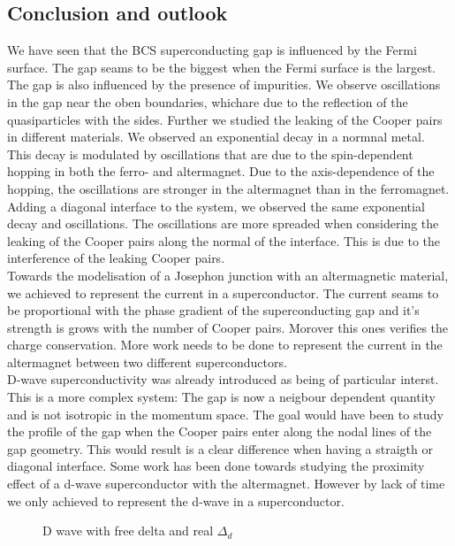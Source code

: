 \documentclass[..\main.tex]{subfile}
\begin{document}
\subsection{Conclusion and outlook}
We have seen that the BCS superconducting gap is influenced by the Fermi surface. The gap seams to be the biggest when the Fermi surface is the largest.
The gap is also influenced by the presence of impurities. We observe oscillations in the gap near the oben boundaries, whichare due to the reflection
of the quasiparticles with the sides.
Further we studied the leaking of the Cooper pairs in different materials. We observed an exponential decay in a normnal metal.
This decay is modulated by oscillations that are due to the spin-dependent hopping in both the ferro- and altermagnet.
Due to the axis-dependence of the hopping, the oscillations are stronger in the altermagnet than in the ferromagnet.\\
Adding a diagonal interface to the system, we observed the same exponential decay and oscillations. The oscillations are more spreaded when considering
the leaking of the Cooper pairs along the normal of the interface. This is due to the interference of the leaking Cooper pairs.\\
Towards the modelisation of a Josephon junction with an altermagnetic material, we achieved to represent the current in a superconductor.
The current seams to be proportional with the phase gradient of the superconducting gap and it's strength is grows with the number of Cooper pairs.
Morover this ones verifies the charge conservation.
More work needs to be done to represent the current in the altermagnet between two different superconductors.\\

D-wave superconductivity was already introduced as being of particular interst. This is a more complex system:
The gap is now a neigbour dependent quantity and is not isotropic in the momentum space. The goal would have been 
to study the profile of the gap when the Cooper pairs enter along the nodal lines of the gap geometry. This
would result is a clear difference when having a straigth or diagonal interface. 
 Some work has been done towards studying the
proximity effect of a d-wave superconductor with the altermagnet. However by lack of time we only achieved to represent the d-wave in a superconductor.\\

\begin{figure}[H]
    
    \caption{D wave with free delta and real $\Delta_d$}
\end{figure}
\end{document}
